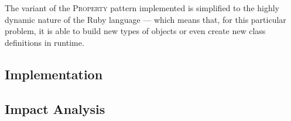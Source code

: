 The variant of the \textsc{Property} pattern implemented is simplified to the highly dynamic nature of the Ruby language --- which means that, for this particular problem, it is able to build new types of objects or even create new class definitions in runtime.

\subsection{Implementation}\label{sec:fa_documents_implementation}

\subsection{Impact Analysis}\label{sec:fa_documents_impact_analysis}
